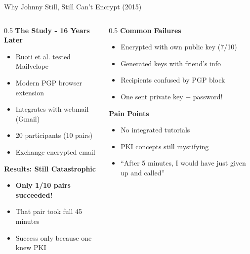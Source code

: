 \documentclass[aspectratio=169, lualatex, handout]{beamer}
\begin{document}
\begin{frame}{Why Johnny Still, Still Can't Encrypt (2015)}
	\begin{columns}[T]
		\begin{column}{0.5\textwidth}
			\textbf{The Study - 16 Years Later}
			\begin{itemize}
				\item Ruoti et al. tested Mailvelope
				\item Modern PGP browser extension
				\item Integrates with webmail (Gmail)
				\item 20 participants (10 pairs)
				\item Exchange encrypted email
			\end{itemize}
			\vspace{0.5em}
			\textbf{Results: Still Catastrophic}
			\begin{itemize}
				\item \textbf{Only 1/10 pairs succeeded!}
				\item That pair took full 45 minutes
				\item Success only because one knew PKI
			\end{itemize}
		\end{column}
		\begin{column}{0.5\textwidth}
			\textbf{Common Failures}
			\begin{itemize}
				\item Encrypted with own public key (7/10)
				\item Generated keys with friend's info
				\item Recipients confused by PGP block
				\item One sent private key + password!
			\end{itemize}
			\vspace{0.5em}
			\textbf{Pain Points}
			\begin{itemize}
				\item No integrated tutorials
				\item PKI concepts still mystifying
				\item ``After 5 minutes, I would have just given up and called''
			\end{itemize}
		\end{column}
	\end{columns}
\end{frame}

\end{document}
